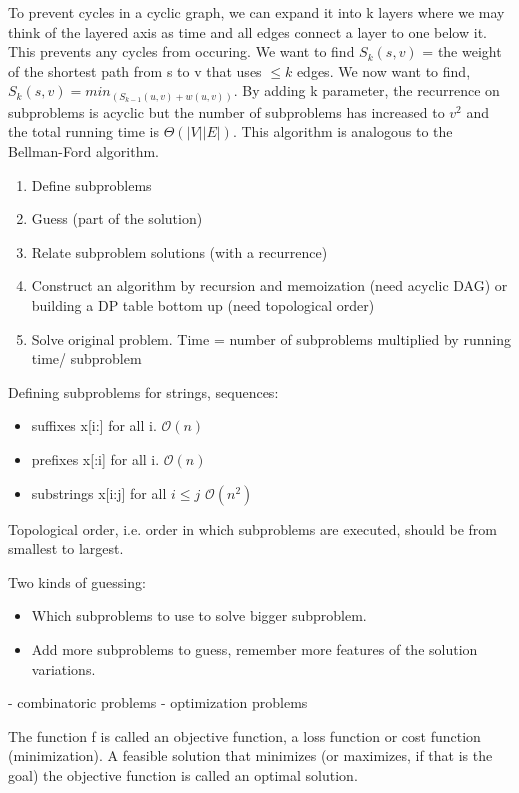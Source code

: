 \documentclass{article}
\begin{document}
    To prevent cycles in a cyclic graph, we can expand it into k layers where we may think of the layered axis as time and all edges connect a layer to one below it. This prevents any cycles from occuring. We want to find $S_k(s,v)$ = the weight of the shortest path from s to v that uses $\leq k$ edges. We now want to find, $S_k(s,v) = min_ (S_{k-1} (u,v) + w(u,v))$. By adding k parameter, the recurrence on subproblems is acyclic but the number of subproblems has increased to $v^2$ and the total running time is $\Theta (|V| |E|)$. This algorithm is analogous to the Bellman-Ford algorithm.
    
    \begin{enumerate}
        \item Define subproblems
        \item Guess (part of the solution)
        \item Relate subproblem solutions (with a recurrence)
        \item Construct an algorithm by recursion and memoization (need acyclic DAG) or building a DP table bottom up (need topological order)
        \item Solve original problem. Time = number of subproblems multiplied by running time/ subproblem
    \end{enumerate}
    
    Defining subproblems for strings, sequences:
    \begin{itemize}
        \item suffixes x[i:] for all i. $\mathcal{O}(n)$
        \item prefixes x[:i] for all i. $\mathcal{O}(n)$
        \item substrings x[i:j] for all $i \leq j$ $\mathcal{O}(n^2)$
    \end{itemize}
    
    Topological order, i.e. order in which subproblems are executed, should be from smallest to largest.
    
    Two kinds of guessing:
    \begin{itemize}
        \item Which subproblems to use to solve bigger subproblem.
        \item Add more subproblems to guess, remember more features of the solution variations.
    \end{itemize}
    
    - combinatoric problems
    - optimization problems
    
    The function f is called an objective function, a loss function or cost function (minimization). A feasible solution that minimizes (or maximizes, if that is the goal) the objective function is called an optimal solution.
\end{document}
